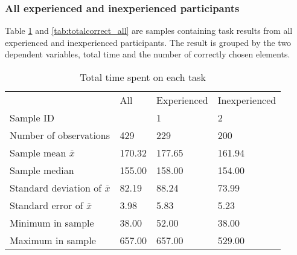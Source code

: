 

\subsubsection{All  experienced and inexperienced participants}\label{sec:alltasks}

Table \ref{tab:totaltime_all} and \ref{tab:totalcorrect_all} are samples containing task results from all experienced and inexperienced participants. The result is grouped by the two dependent variables, total time and the number of correctly chosen elements.

\begin{table}[H]
	\centering
	\begin{tabular}{l|l|l|l}
		& All  & Experienced & Inexperienced \\ 
		Sample ID &   & 1  & 2   \\ \hline
		Number of observations & 429    & 229    & 200   \\
		Sample mean $\overline{x}$     & 170.32 & 177.65  & 161.94     \\
		Sample median  & 155.00 & 158.00  & 154.00  \\
		Standard deviation of $\overline{x}$  & 82.19  & 88.24  & 73.99   \\
		Standard error of $\overline{x}$  & 3.98  & 5.83 & 5.23  \\
		Minimum in sample & 38.00  & 52.00  & 38.00     \\
		Maximum in sample & 657.00 & 657.00  & 529.00    \\ \hline
	\end{tabular}
	\caption[Total time, all participants]{Total time spent on each task}
	\label{tab:totaltime_all}
\end{table}

